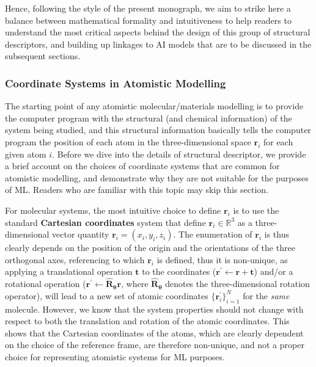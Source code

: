 Hence, following the style of the present monograph, we aim to strike here a balance between mathematical formality and intuitiveness to help readers to understand the most critical aspects behind the design of this group of structural descriptors, and building up linkages to AI models that are to be discussed in the subsequent sections.

\subsubsection{Coordinate Systems in Atomistic Modelling}\label{sec:coordinates_systems}


The starting point of any atomistic molecular/materials modelling is to provide the computer program with the structural (and chemical information) of the system being studied, and this structural information basically tells the computer program the position of each atom in the three-dimensional space $\mathbf{r}_i$ for each given atom $i$. Before we dive into the details of structural descriptor, we provide a brief account on the choices of coordinate systems that are common for atomistic modelling, and demonstrate why they are not suitable for the purposes of ML. Readers who are familiar with this topic may skip this section.

For molecular systems, the most intuitive choice to define $\mathbf{r}_i$ is to use the standard \textbf{Cartesian coordinates} system that define $\mathbf{r}_i\in\mathbb{R}^3$ as a three-dimensional vector quantity $\mathbf{r}_i=(x_i,y_i,z_i)$. The enumeration of $\mathbf{r}_i$ is thus clearly depends on the position of the origin and the orientations of the three orthogonal axes, referencing to which $\mathbf{r}_i$ is defined, thus it is non-unique, as  applying  a translational operation $\bm{t}$ to the coordinates ($\bm{r}^\prime\leftarrow \bm{r}+\bm{t}$)  and/or a rotational operation ($\bm{r}^\prime\leftarrow \hat{\bm{R}}_{\boldsymbol{\theta}}\bm{r}$, where $\hat{\bm{R}}_{\boldsymbol{\theta}}$ denotes the three-dimensional rotation operator), will lead to a new set of atomic coordinates $\{\bm{r}^\prime_i\}_{i=1}^N$ for the \textit{same} molecule. However, we know that the system properties should not change with respect to both the translation and rotation of the atomic coordinates. This shows that the Cartesian coordinates of the atoms, which are clearly dependent on the choice of the reference frame, are therefore non-unique, and not a proper choice for representing atomistic systems for ML purposes.

